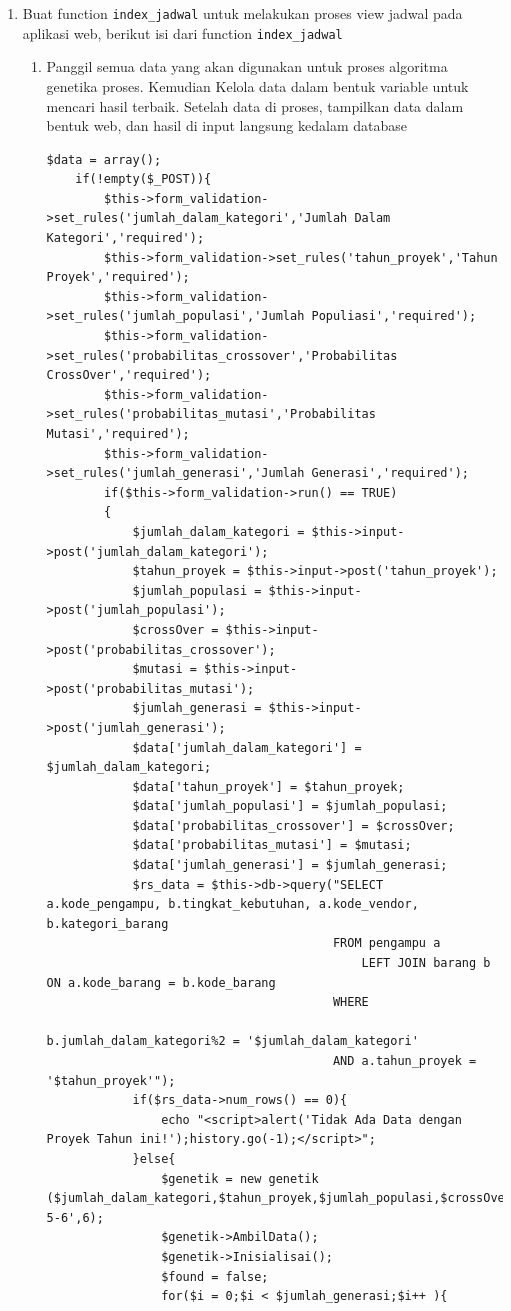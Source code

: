 \begin{enumerate}
\begin{enumerate}
	\item Buat function \verb|index_jadwal| untuk melakukan proses view jadwal pada aplikasi web, berikut isi dari function \verb|index_jadwal|
        \begin{enumerate}
            \item Panggil semua data yang akan digunakan untuk proses algoritma genetika proses. Kemudian Kelola data dalam bentuk variable untuk mencari hasil terbaik. Setelah data di proses, tampilkan data dalam bentuk web, dan hasil di input langsung kedalam database
\begin{lstlisting}
$data = array();
	if(!empty($_POST)){
		$this->form_validation->set_rules('jumlah_dalam_kategori','Jumlah Dalam Kategori','required');
		$this->form_validation->set_rules('tahun_proyek','Tahun Proyek','required');
		$this->form_validation->set_rules('jumlah_populasi','Jumlah Populiasi','required');
		$this->form_validation->set_rules('probabilitas_crossover','Probabilitas CrossOver','required');
		$this->form_validation->set_rules('probabilitas_mutasi','Probabilitas Mutasi','required');
		$this->form_validation->set_rules('jumlah_generasi','Jumlah Generasi','required');
		if($this->form_validation->run() == TRUE)
		{				
			$jumlah_dalam_kategori = $this->input->post('jumlah_dalam_kategori');
			$tahun_proyek = $this->input->post('tahun_proyek');
			$jumlah_populasi = $this->input->post('jumlah_populasi');
			$crossOver = $this->input->post('probabilitas_crossover');
			$mutasi = $this->input->post('probabilitas_mutasi');
			$jumlah_generasi = $this->input->post('jumlah_generasi');
			$data['jumlah_dalam_kategori'] = $jumlah_dalam_kategori;
			$data['tahun_proyek'] = $tahun_proyek;
			$data['jumlah_populasi'] = $jumlah_populasi;
			$data['probabilitas_crossover'] = $crossOver;
			$data['probabilitas_mutasi'] = $mutasi;
			$data['jumlah_generasi'] = $jumlah_generasi;
		    $rs_data = $this->db->query("SELECT a.kode_pengampu, b.tingkat_kebutuhan, a.kode_vendor, b.kategori_barang
										FROM pengampu a
											LEFT JOIN barang b ON a.kode_barang = b.kode_barang
										WHERE 
											b.jumlah_dalam_kategori%2 = '$jumlah_dalam_kategori'
										AND a.tahun_proyek = '$tahun_proyek'");
			if($rs_data->num_rows() == 0){
				echo "<script>alert('Tidak Ada Data dengan Proyek Tahun ini!');history.go(-1);</script>";
			}else{
				$genetik = new genetik ($jumlah_dalam_kategori,$tahun_proyek,$jumlah_populasi,$crossOver,$mutasi,5,'4-5-6',6);
				$genetik->AmbilData();
				$genetik->Inisialisai();
				$found = false;
				for($i = 0;$i < $jumlah_generasi;$i++ ){

\end{lstlisting}
\end{enumerate}
\end{enumerate}
\end{enumerate}
